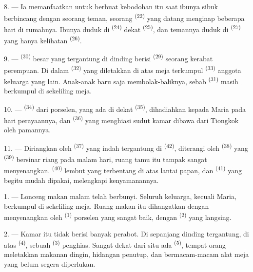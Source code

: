 8. --- Ia memanfaatkan untuk berbuat kebodohan itu saat ibunya sibuk
berbincang dengan seorang teman, seorang 
\textsuperscript{(22)} yang datang menginap beberapa hari di rumahnya.
Ibunya duduk di  \textsuperscript{(24)} dekat
 \textsuperscript{(25)}, dan temannya duduk di
 \textsuperscript{(27)} yang hanya kelihatan
 \textsuperscript{(26)}.

9. ---  \textsuperscript{(30)} besar yang tergantung
di dinding berisi  \textsuperscript{(29)} seorang
kerabat perempuan. Di dalam  \textsuperscript{(32)} yang
diletakkan di atas meja terkumpul 
\textsuperscript{(33)} anggota keluarga yang lain. Anak-anak baru saja
membolak-baliknya, sebab  \textsuperscript{(31)}
masih berkumpul di sekeliling meja.

10. ---  \textsuperscript{(34)} dari
porselen, yang ada di dekat 
\textsuperscript{(35)}, dihadiahkan kepada Maria pada hari
perayaannya, dan  \textsuperscript{(36)} yang
menghiasi sudut kamar dibawa dari Tiongkok oleh pamannya.

11. --- Diriangkan oleh  \textsuperscript{(37)}
yang indah tergantung di  \textsuperscript{(42)},
diterangi oleh  \textsuperscript{(38)} yang
 \textsuperscript{(39)} bersinar riang
pada malam hari, ruang tamu itu tampak sangat menyenangkan.
 \textsuperscript{(40)} lembut yang terbentang di
atas lantai papan, dan  \textsuperscript{(41)} yang
begitu mudah dipakai, melengkapi kenyamanannya.

\VUsaut{3.6mm}
\VUsaut{3.0mm}

1. --- Lonceng makan malam telah berbunyi. Seluruh keluarga, kecuali
Maria, berkumpul di sekeliling meja. Ruang makan itu dihangatkan
dengan menyenangkan oleh  \textsuperscript{(1)} porselen
yang sangat baik, dengan  \textsuperscript{(2)} yang
langsing.

2. --- Kamar itu tidak berisi banyak perabot. Di sepanjang dinding
tergantung, di atas  \textsuperscript{(4)}, sebuah
 \textsuperscript{(3)} penghias. Sangat dekat
dari situ ada  \textsuperscript{(5)}, tempat orang
meletakkan makanan dingin, hidangan penutup, dan bermacam-macam alat
meja yang belum segera diperlukan.

